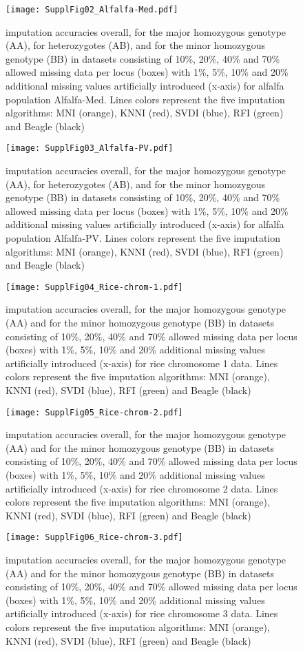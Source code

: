 \begin{figure}\texttt{[image: SupplFig02\_Alfalfa-Med.pdf]}\caption{
imputation accuracies overall, for the major homozygous genotype (AA), for heterozygotes (AB), and for the minor homozygous genotype (BB) in datasets consisting of
10\%, 20\%, 40\% and 70\% allowed missing data per locus (boxes) with 1\%, 5\%, 10\% and 20\%
additional missing values artificially introduced (x-axis) for alfalfa population Alfalfa-Med.
Lines colors represent the five imputation algorithms: MNI
(orange), KNNI (red), SVDI (blue), RFI (green) and Beagle (black)}\end{figure}
\begin{figure}\texttt{[image: SupplFig03\_Alfalfa-PV.pdf]}\caption{
imputation accuracies overall, for the major homozygous genotype (AA), for heterozygotes (AB), and for the minor homozygous genotype (BB) in datasets consisting of
10\%, 20\%, 40\% and 70\% allowed missing data per locus (boxes) with 1\%, 5\%, 10\% and 20\%
additional missing values artificially introduced (x-axis) for alfalfa population Alfalfa-PV.
Lines colors represent the five imputation algorithms: MNI
(orange), KNNI (red), SVDI (blue), RFI (green) and Beagle (black)}\end{figure}
\begin{figure}\texttt{[image: SupplFig04\_Rice-chrom-1.pdf]}\caption{
imputation accuracies overall, for the major homozygous genotype (AA) and for the minor homozygous genotype (BB) in datasets consisting of
10\%, 20\%, 40\% and 70\% allowed missing data per locus (boxes) with 1\%, 5\%, 10\% and 20\%
additional missing values artificially introduced (x-axis) for rice chromosome 1 data.
Lines colors represent the five imputation algorithms: MNI
(orange), KNNI (red), SVDI (blue), RFI (green) and Beagle (black)}\end{figure}
\begin{figure}\texttt{[image: SupplFig05\_Rice-chrom-2.pdf]}\caption{
imputation accuracies overall, for the major homozygous genotype (AA) and for the minor homozygous genotype (BB) in datasets consisting of
10\%, 20\%, 40\% and 70\% allowed missing data per locus (boxes) with 1\%, 5\%, 10\% and 20\%
additional missing values artificially introduced (x-axis) for rice chromosome 2 data.
Lines colors represent the five imputation algorithms: MNI
(orange), KNNI (red), SVDI (blue), RFI (green) and Beagle (black)}\end{figure}
\begin{figure}\texttt{[image: SupplFig06\_Rice-chrom-3.pdf]}\caption{
imputation accuracies overall, for the major homozygous genotype (AA) and for the minor homozygous genotype (BB) in datasets consisting of
10\%, 20\%, 40\% and 70\% allowed missing data per locus (boxes) with 1\%, 5\%, 10\% and 20\%
additional missing values artificially introduced (x-axis) for rice chromosome 3 data.
Lines colors represent the five imputation algorithms: MNI
(orange), KNNI (red), SVDI (blue), RFI (green) and Beagle (black)}\end{figure}
